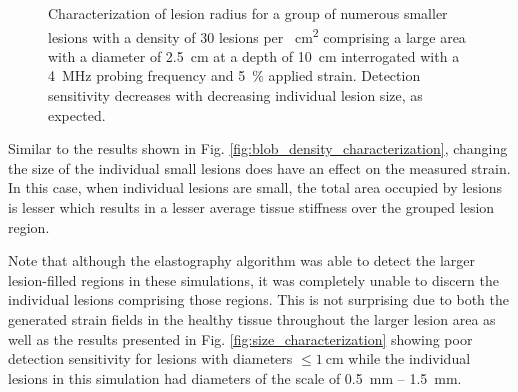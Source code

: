 			\begin{figure}[!htb]
				\centering
				\caption[Quasi-static clustered lesion radius characterization]{Characterization of lesion radius for a group of numerous smaller lesions with a density of 30 lesions per \SI{}{cm^2} comprising a large area with a diameter of \SI{2.5}{\cm} at a depth of \SI{10}{\cm} interrogated with a \SI{4}{\MHz} probing frequency and \SI{5}{\percent} applied strain. Detection sensitivity decreases with decreasing individual lesion size, as expected.}
				\label{fig:blob_radius_characterization}
			\end{figure}

			Similar to the results shown in Fig. \ref{fig:blob_density_characterization}, changing the size of the individual small lesions does have an effect on the measured strain. In this case, when individual lesions are small, the total area occupied by lesions is lesser which results in a lesser average tissue stiffness over the grouped lesion region.

			Note that although the elastography algorithm was able to detect the larger lesion-filled regions in these simulations, it was completely unable to discern the individual lesions comprising those regions. This is not surprising due to both the generated strain fields in the healthy tissue throughout the larger lesion area as well as the results presented in Fig. \ref{fig:size_characterization} showing poor detection sensitivity for lesions with diameters $\leq \SI{1}{\cm}$ while the individual lesions in this simulation had diameters of the scale of \SI{0.5}{\mm} -- \SI{1.5}{\mm}.

